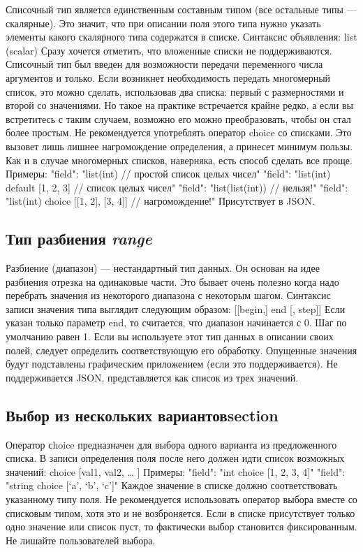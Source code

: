 Списочный тип является единственным составным типом (все остальные типы — скалярные). Это значит, что при описании поля этого типа нужно указать элементы какого скалярного типа содержатся в списке. Синтаксис объявления:
        list (scalar)
Сразу хочется отметить, что вложенные списки не поддерживаются.
Списочный тип был введен для возможности передачи переменного числа аргументов и только. Если возникнет необходимость передать многомерный список, это можно сделать, использовав два списка: первый с размерностями и второй со значениями. Но такое на практике встречается крайне редко, а если вы встретитесь с таким случаем, возможно его можно преобразовать, чтобы он стал более простым.
Не рекомендуется употреблять оператор choice со списками. Это вызовет лишь лишнее нагромождение определения, а принесет минимум пользы. Как и в случае многомерных списков, наверняка, есть способ сделать все проще.
Примеры:
"field": "list(int) // простой список целых чисел"
"field": "list(int) default [1, 2, 3] // список целых чисел"
"field": "list(list(int)) // нельзя!"
"field": "list(int) choice [[1, 2], [3, 4]] // нагромождение!"
Присутствует в JSON.

\subsection{Тип разбиения \emph{range}}

Разбиение (диапазон) — нестандартный тип данных. Он основан на идее разбиения отрезка на одинаковые части. Это бывает очень полезно когда надо перебрать значения из некоторого диапазона с некоторым шагом.
Синтаксис записи значения типа выглядит следующим образом:
        [[begin,] end [, step]]
Если указан только параметр end, то считается, что диапазон начинается с 0. Шаг по умолчанию равен 1. Если вы используете этот тип данных в описании своих полей, следует определить соответствующую его обработку. Опущенные значения будут подставлены графическим приложением (если это поддерживается).
Не поддерживается JSON, представляется как список из трех значений.

\subsection{Выбор из нескольких вариантовsection}

Оператор сhoice предназначен для выбора одного варианта из предложенного списка. В записи определения поля после него должен идти список возможных значений:
choice [val1, val2, … ]
Примеры:
        "field": "int choice [1, 2, 3, 4]"
        "field": "string choice [‘a’, ‘b’, ‘c’]"
Каждое значение в списке должно соответствовать указанному типу поля. Не рекомендуется использовать оператор выбора вместе со списковым типом, хотя это и не возброняется.
Если в списке присутствует только одно значение или список пуст, то фактически выбор становится фиксированным. Не лишайте пользователей выбора.

